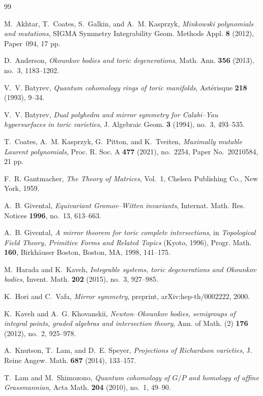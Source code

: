 \documentclass{article}
\begin{document}
\begin{thebibliography}{99}

M.~Akhtar, T.~Coates, S.~Galkin, and A.~M. Kasprzyk,
\emph{Minkowski polynomials and mutations},
SIGMA Symmetry Integrability Geom. Methods Appl. \textbf{8} (2012),
Paper~094, 17 pp.

D.~Anderson,
\emph{Okounkov bodies and toric degenerations},
Math. Ann. \textbf{356} (2013), no.~3, 1183--1202.

V.~V. Batyrev,
\emph{Quantum cohomology rings of toric manifolds},
Ast\'erisque \textbf{218} (1993), 9--34.

V.~V. Batyrev,
\emph{Dual polyhedra and mirror symmetry for Calabi--Yau hypersurfaces in toric varieties},
J. Algebraic Geom. \textbf{3} (1994), no.~3, 493--535.

T.~Coates, A.~M. Kasprzyk, G.~Pitton, and K.~Tveiten,
\emph{Maximally mutable Laurent polynomials},
Proc. R. Soc. A \textbf{477} (2021), no.~2254, Paper No.~20210584,
21 pp.

F.~R. Gantmacher,
\emph{The Theory of Matrices}, Vol.~1,
Chelsea Publishing Co., New York, 1959.

A.~B. Givental,
\emph{Equivariant Gromov--Witten invariants},
Internat. Math. Res. Notices \textbf{1996}, no.~13, 613--663.

A.~B. Givental,
\emph{A mirror theorem for toric complete intersections},
in \emph{Topological Field Theory, Primitive Forms and Related Topics}
(Kyoto, 1996), Progr. Math. \textbf{160},
Birkh\"auser Boston, Boston, MA, 1998, 141--175.

M.~Harada and K.~Kaveh,
\emph{Integrable systems, toric degenerations and Okounkov bodies},
Invent. Math. \textbf{202} (2015), no.~3, 927--985.

K.~Hori and C.~Vafa,
\emph{Mirror symmetry},
preprint, arXiv:hep-th/0002222, 2000.

K.~Kaveh and A.~G. Khovanskii,
\emph{Newton--Okounkov bodies, semigroups of integral points, graded algebras and intersection theory},
Ann. of Math. (2) \textbf{176} (2012), no.~2, 925--978.

A.~Knutson, T.~Lam, and D.~E. Speyer,
\emph{Projections of Richardson varieties},
J. Reine Angew. Math. \textbf{687} (2014), 133--157.

T.~Lam and M.~Shimozono,
\emph{Quantum cohomology of \(G/P\) and homology of affine Grassmannian},
Acta Math. \textbf{204} (2010), no.~1, 49--90.


\end{thebibliography}
\end{document}
